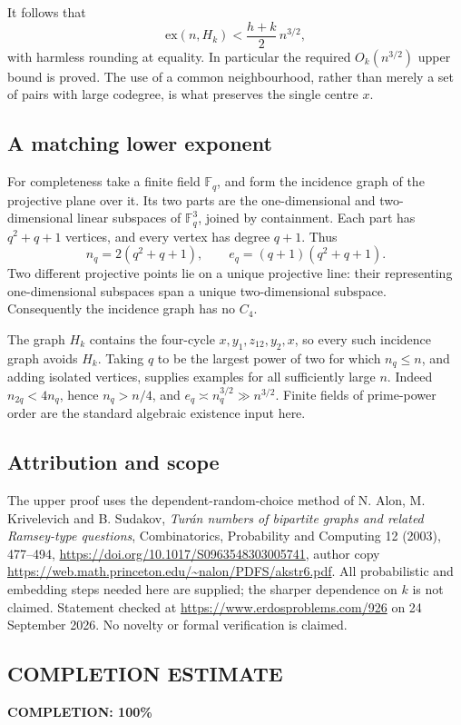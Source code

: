 It follows that
\[
\mathrm{ex}(n,H_k)<\frac{h+k}{2}\,n^{3/2},
\]
with harmless rounding at equality. In particular the required \(O_k(n^{3/2})\) upper bound is proved. The use of a common neighbourhood, rather than merely a set of pairs with large codegree, is what preserves the single centre \(x\).

\subsection*{A matching lower exponent}
For completeness take a finite field \(\mathbb F_q\), and form the incidence graph of the projective plane over it. Its two parts are the one-dimensional and two-dimensional linear subspaces of \(\mathbb F_q^3\), joined by containment. Each part has \(q^2+q+1\) vertices, and every vertex has degree \(q+1\). Thus
\[
n_q=2(q^2+q+1),\qquad e_q=(q+1)(q^2+q+1).
\]
Two different projective points lie on a unique projective line: their representing one-dimensional subspaces span a unique two-dimensional subspace. Consequently the incidence graph has no \(C_4\).

The graph \(H_k\) contains the four-cycle \(x,y_1,z_{12},y_2,x\), so every such incidence graph avoids \(H_k\). Taking \(q\) to be the largest power of two for which \(n_q\leq n\), and adding isolated vertices, supplies examples for all sufficiently large \(n\). Indeed \(n_{2q}<4n_q\), hence \(n_q>n/4\), and \(e_q\asymp n_q^{3/2}\gg n^{3/2}\). Finite fields of prime-power order are the standard algebraic existence input here.

\subsection*{Attribution and scope}
The upper proof uses the dependent-random-choice method of N. Alon, M. Krivelevich and B. Sudakov, \emph{Tur\'an numbers of bipartite graphs and related Ramsey-type questions}, Combinatorics, Probability and Computing 12 (2003), 477--494, \url{https://doi.org/10.1017/S0963548303005741}, author copy \url{https://web.math.princeton.edu/~nalon/PDFS/akstr6.pdf}. All probabilistic and embedding steps needed here are supplied; the sharper dependence on \(k\) is not claimed. Statement checked at \url{https://www.erdosproblems.com/926} on 24 September 2026. No novelty or formal verification is claimed.
\subsection*{COMPLETION ESTIMATE}
\textbf{COMPLETION: 100\%}
